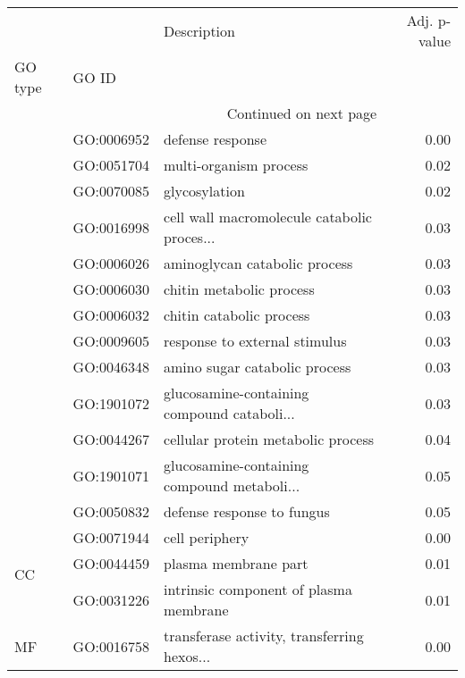 \begin{longtable}{lllr}
\toprule
   &            &                                  Description &  Adj. p-value \\
GO type & GO ID &                                              &               \\
\midrule
\endhead
\midrule
\multicolumn{3}{r}{{Continued on next page}} \\
\midrule
\endfoot

\bottomrule
\endlastfoot
\multirow{13}{*}{BP} & GO:0006952 &                             defense response &          0.00 \\
   & GO:0051704 &                       multi-organism process &          0.02 \\
   & GO:0070085 &                                glycosylation &          0.02 \\
   & GO:0016998 &  cell wall macromolecule catabolic proces... &          0.03 \\
   & GO:0006026 &                aminoglycan catabolic process &          0.03 \\
   & GO:0006030 &                     chitin metabolic process &          0.03 \\
   & GO:0006032 &                     chitin catabolic process &          0.03 \\
   & GO:0009605 &                response to external stimulus &          0.03 \\
   & GO:0046348 &                amino sugar catabolic process &          0.03 \\
   & GO:1901072 &  glucosamine-containing compound cataboli... &          0.03 \\
   & GO:0044267 &           cellular protein metabolic process &          0.04 \\
   & GO:1901071 &  glucosamine-containing compound metaboli... &          0.05 \\
   & GO:0050832 &                   defense response to fungus &          0.05 \\
\cline{1-4}
\multirow{3}{*}{CC} & GO:0071944 &                               cell periphery &          0.00 \\
   & GO:0044459 &                         plasma membrane part &          0.01 \\
   & GO:0031226 &       intrinsic component of plasma membrane &          0.01 \\
\cline{1-4}
\multirow{12}{*}{MF} & GO:0016758 &  transferase activity, transferring hexos... &          0.00 \\

\end{longtable}
